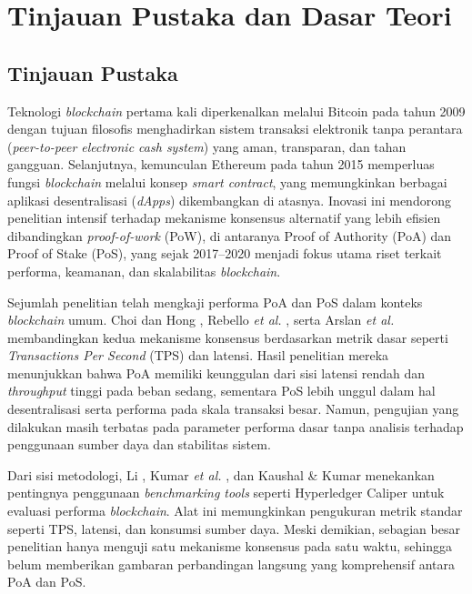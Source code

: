 \chapter{Tinjauan Pustaka dan Dasar Teori}

\section{Tinjauan Pustaka}

Teknologi \textit{blockchain} pertama kali diperkenalkan melalui Bitcoin pada tahun 2009 dengan tujuan filosofis menghadirkan sistem transaksi elektronik tanpa perantara (\textit{peer-to-peer electronic cash system}) yang aman, transparan, dan tahan gangguan. Selanjutnya, kemunculan Ethereum pada tahun 2015 memperluas fungsi \textit{blockchain} melalui konsep \textit{smart contract}, yang memungkinkan berbagai aplikasi desentralisasi (\textit{dApps}) dikembangkan di atasnya. Inovasi ini mendorong penelitian intensif terhadap mekanisme konsensus alternatif yang lebih efisien dibandingkan \textit{proof-of-work} (PoW), di antaranya Proof of Authority (PoA) dan Proof of Stake (PoS), yang sejak 2017–2020 menjadi fokus utama riset terkait performa, keamanan, dan skalabilitas \textit{blockchain}.

Sejumlah penelitian telah mengkaji performa PoA dan PoS dalam konteks \textit{blockchain} umum. Choi dan Hong \cite{choi2020} , Rebello \textit{et al.} \cite{rebello2020}, serta Arslan \textit{et al.} \cite{arslan2020} membandingkan kedua mekanisme konsensus berdasarkan metrik dasar seperti \textit{Transactions Per Second} (TPS) dan latensi. Hasil penelitian mereka menunjukkan bahwa PoA memiliki keunggulan dari sisi latensi rendah dan \textit{throughput} tinggi pada beban sedang, sementara PoS lebih unggul dalam hal desentralisasi serta performa pada skala transaksi besar. Namun, pengujian yang dilakukan masih terbatas pada parameter performa dasar tanpa analisis terhadap penggunaan sumber daya dan stabilitas sistem.

Dari sisi metodologi, Li \cite{li2021}, Kumar \textit{et al.} \cite{kumar2020}, dan Kaushal \& Kumar \cite{kaushal2020} menekankan pentingnya penggunaan \textit{benchmarking tools} seperti Hyperledger Caliper untuk evaluasi performa \textit{blockchain}. Alat ini memungkinkan pengukuran metrik standar seperti TPS, latensi, dan konsumsi sumber daya. Meski demikian, sebagian besar penelitian hanya menguji satu mekanisme konsensus pada satu waktu, sehingga belum memberikan gambaran perbandingan langsung yang komprehensif antara PoA dan PoS.

